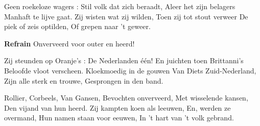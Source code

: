 \footnotemark [
ititle= {Voor outer en heerd}[

\footnotetext{Auteurs : Jef Simons, Armand Preud'homme.}]

\beginverse
Geen roekeloze wagers :
Stil volk dat zich beraadt,
Aleer het zijn belagers
Manhaft te lijve gaat.
Zij wisten wat zij wilden,
Toen zij tot stout verweer
De piek of zeis optilden,
Of grepen naar 't geweer.
\endverse

\beginchorus
\textbf{Refrain}
{Onverveerd voor outer en heerd!}
\endchorus

\beginverse
Zij steunden op Oranje's :
De Nederlanden één!
En juichten toen Brittanni's
Beloofde vloot verscheen.
Kloekmoedig in de gouwen
Van Diets Zuid-Nederland,
Zijn alle sterk en trouwe,
Gesprongen in den band.
\endverse

\beginverse
Rollier, Corbeels, Van Gansen,
Bevochten onverveerd,
Met wisselende kansen,
Den vijand van hun heerd.
Zij kampten koen als leeuwen,
En, werden ze overmand,
Hun namen staan voor eeuwen,
In 't hart van 't volk gebrand.
\endverse
\endsong